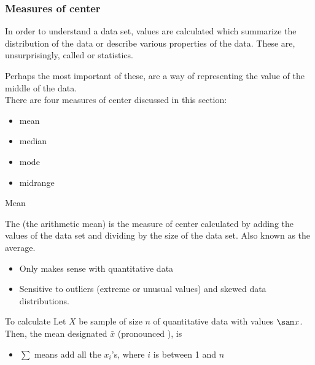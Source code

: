 \documentclass[xcolor=table, aspectratio=169, bigger]{beamer}
\begin{document}
\begin{frame}
\frametitle{Measures of center}
\begin{block}{}
In order to understand a data set, values are calculated which summarize the distribution of the data or describe various properties of the data. These are, unsurprisingly, called  or  statistics.
\end{block}
\pause
\begin{block}{}
Perhaps the most important of these,  are a way of  representing the value of the middle of the data.\\
\medskip
There are four measures of center discussed in this section:
\begin{itemize}
\item mean
\item median
\item mode
\item midrange
\end{itemize} 
\end{block}
\end{frame}

\begin{frame}{Mean}
\begin{block}{}
The  (the arithmetic mean) is the measure of center calculated by adding the values of the data set and dividing by the size of the data set. Also known as the average.
\begin{itemize}
\item Only makes sense with quantitative data
\item Sensitive to outliers (extreme or unusual values) and skewed data distributions.
\end{itemize}
\end{block}

\pause
\begin{block}{To calculate}
Let $X$ be sample of size $n$ of quantitative data with values $\sam x$. Then, the mean designated $\bar x$ (pronounced ), is\\ \smallskip
{}
\begin{itemize}
\item $\sum$ means add all the $x_i$'s, where $i$ is between 1 and $n$
\end{itemize}
\end{block}
\end{frame}
\end{document}
